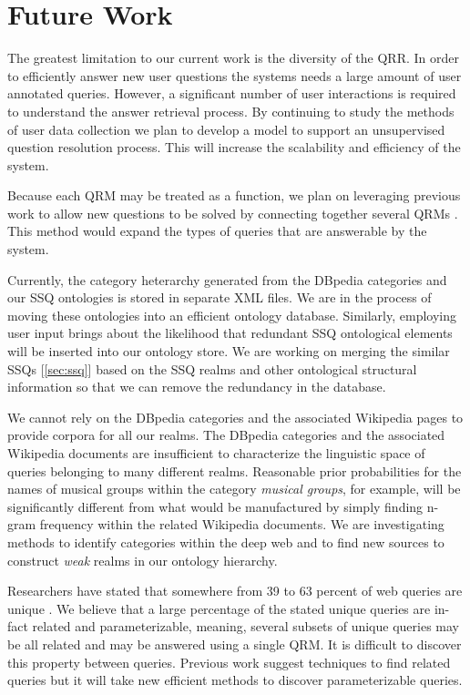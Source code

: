 \section{Future Work}

The greatest limitation to our current work is the diversity of the
QRR.  In order to efficiently answer new user questions the systems
needs a large amount of user annotated queries.  However, a
significant number of user interactions is required to understand the
answer retrieval process.  By continuing to study the methods of user
data collection we plan to develop a model to support an unsupervised
question resolution process.  This will increase the scalability and
efficiency of the system.

Because each QRM may be treated as a function, we plan on leveraging
previous work to allow new questions to be solved by connecting
together several QRMs \cite{morpheus1, transformscout}.  This method
would expand the types of queries that are answerable by the system.

Currently, the category heterarchy generated from the DBpedia
categories and our SSQ ontologies is stored in separate XML files. We
are in the process of moving these ontologies into an efficient
ontology database. Similarly, employing user input brings about the
likelihood that redundant SSQ ontological elements will be inserted
into our ontology store. We are working on merging the similar SSQs
[\ref{sec:ssq}] based on the SSQ realms and other ontological
structural information so that we can remove the redundancy in the
database.

We cannot rely on the DBpedia categories and the associated Wikipedia
pages to provide corpora for all our realms.  The DBpedia categories
and the associated Wikipedia documents are insufficient to
characterize the linguistic space of queries belonging to many
different realms.  Reasonable prior probabilities for the names of
musical groups within the category \emph{musical groups}, for example,
will be significantly different from what would be manufactured by
simply finding n-gram frequency within the related Wikipedia
documents. We are investigating methods to identify categories within
the deep web and to find new sources to construct \textit{weak} realms
in our ontology hierarchy.


Researchers have stated that somewhere from 39 to 63 percent of web
queries are unique \cite{1277770,331405,621942}.  We believe that a
large percentage of the stated unique queries are in-fact related and
parameterizable, meaning, several subsets of unique queries may be all
related and may be answered using a single QRM.  It is difficult to
discover this property between queries.  Previous work suggest
techniques to find related queries but it will take new efficient
methods to discover parameterizable queries.

